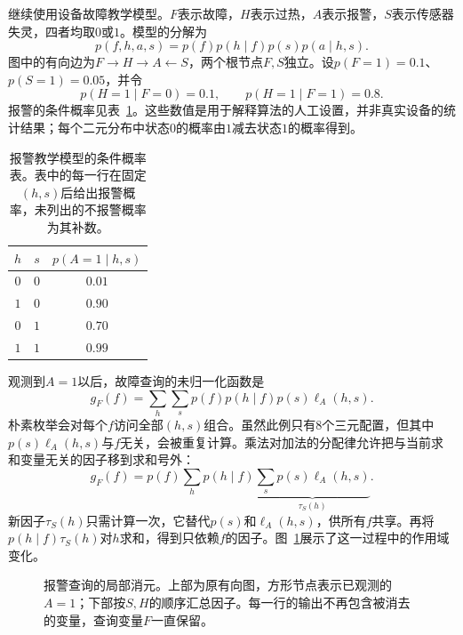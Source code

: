 继续使用设备故障教学模型。$F$表示故障，$H$表示过热，$A$表示报警，$S$表示传感器失灵，四者均取$0$或$1$。模型的分解为
\begin{equation}
  p(f,h,a,s)=p(f)p(h\mid f)p(s)p(a\mid h,s).
  \label{eq:pgm-elimination-alarm-model}
\end{equation}
图中的有向边为$F\to H\to A\leftarrow S$，两个根节点$F,S$独立。设$p(F=1)=0.1$、$p(S=1)=0.05$，并令
\[
  p(H=1\mid F=0)=0.1,\qquad
  p(H=1\mid F=1)=0.8.
\]
报警的条件概率见表~\ref{tab:pgm-elimination-alarm-cpt}。这些数值是用于解释算法的人工设置，并非真实设备的统计结果；每个二元分布中状态$0$的概率由$1$减去状态$1$的概率得到。

\begin{table}[htbp]
  \centering
  \begin{tabular}{ccc}
    \toprule
    $h$ & $s$ & $p(A=1\mid h,s)$\\
    \midrule
    $0$ & $0$ & $0.01$\\
    $1$ & $0$ & $0.90$\\
    $0$ & $1$ & $0.70$\\
    $1$ & $1$ & $0.99$\\
    \bottomrule
  \end{tabular}
  \caption{报警教学模型的条件概率表。表中的每一行在固定$(h,s)$后给出报警概率，未列出的不报警概率为其补数。}
  \label{tab:pgm-elimination-alarm-cpt}
\end{table}

观测到$A=1$以后，故障查询的未归一化函数是
\[
  g_F(f)=\sum_h\sum_s p(f)p(h\mid f)p(s)\ell_A(h,s).
\]
朴素枚举会对每个$f$访问全部$(h,s)$组合。虽然此例只有$8$个三元配置，但其中$p(s)\ell_A(h,s)$与$f$无关，会被重复计算。乘法对加法的分配律允许把与当前求和变量无关的因子移到求和号外：
\begin{equation}
  g_F(f)
  =p(f)\sum_h p(h\mid f)
    \underbrace{\sum_s p(s)\ell_A(h,s)}_{\tau_S(h)}.
  \label{eq:pgm-elimination-alarm-reorder}
\end{equation}
新因子$\tau_S(h)$只需计算一次，它替代$p(s)$和$\ell_A(h,s)$，供所有$f$共享。再将$p(h\mid f)\tau_S(h)$对$h$求和，得到只依赖$f$的因子。图~\ref{fig:pgm-elimination-alarm-buckets}展示了这一过程中的作用域变化。

\begin{figure}[htbp]
  \centering
  
  \caption{报警查询的局部消元。上部为原有向图，方形节点表示已观测的$A=1$；下部按$S,H$的顺序汇总因子。每一行的输出不再包含被消去的变量，查询变量$F$一直保留。}
  \label{fig:pgm-elimination-alarm-buckets}
\end{figure}


